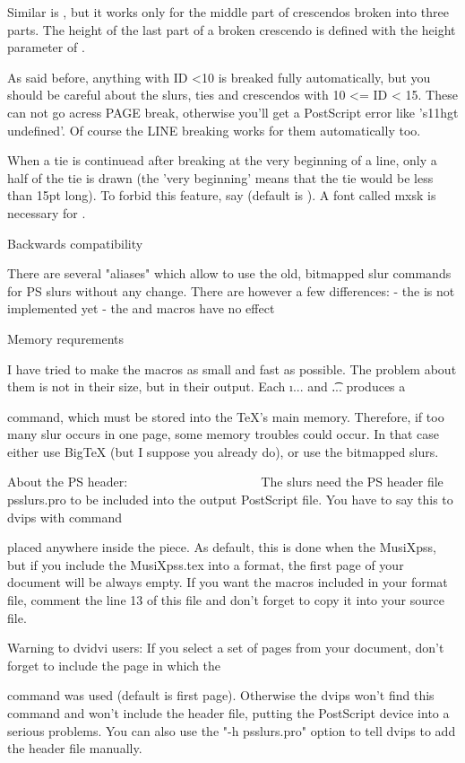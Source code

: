 Similar is \liftcresc, but it works only for the middle part of crescendos
broken into three parts. The height of the last part of a broken crescendo
is defined with the height parameter of \Tcresc.

As said before, anything with ID <10 is breaked fully automatically, but
you should be careful about the slurs, ties and crescendos with 10 <= ID < 15.
These can not go acress PAGE break, otherwise you'll get a PostScript error
like 's11hgt undefined'. Of course the LINE breaking works for them
automatically too.

When a tie is continuead after breaking at the very beginning of a line,
only a half of the tie is drawn (the 'very beginning' means that the tie
would be less than 15pt long). To forbid this feature, say \nohalfties
(default is \halfties). A font called mxsk is necessary for \halfties.


Backwards compatibility
~~~~~~~~~~~~~~~~~~~~~~~

There are several "aliases" which allow to use the old, bitmapped slur
commands for PS slurs without any change. There are however a few differences:
- the \invertslur is not implemented yet
- the \curve and \midslur macros have no effect




Memory requrements
~~~~~~~~~~~~~~~~~~

I have tried to make the macros as small and fast as possible. The problem
about them is not in their size, but in their output. Each \i... and \t...
produces a \special command, which must be stored into the TeX's main memory.
Therefore, if too many slur occurs in one page, some memory troubles could
occur. In that case either use BigTeX (but I suppose you already do), or
use the bitmapped slurs.



About the PS header:
~~~~~~~~~~~~~~~~~~~~
The slurs need the PS header file psslurs.pro to be included into the
output PostScript file. You have to say this to dvips with command


placed anywhere inside the piece. As default, this is done when 
the MusiXpss, but if you include the MusiXpss.tex into a format, the first
page of your document will be always empty. If you want the macros included
in your format file, comment the line 13 of this file and don't forget
to copy it into your source file.

Warning to dvidvi users: If you select a set of pages from your document,
don't forget to include the page in which the \special command was used
(default is first page). Otherwise the dvips won't find this command and
won't include the header file, putting the PostScript device into a serious
problems. You can also use the "-h psslurs.pro" option to tell dvips to add
the header file manually.


